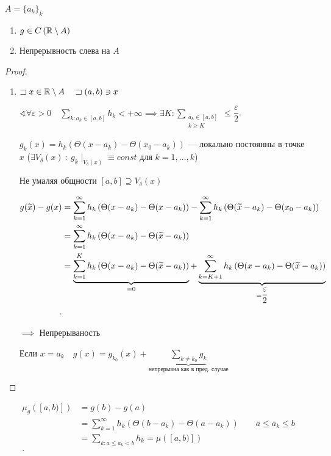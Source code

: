 \begin{statement}
    $A = \{a_k\}_k$
    \begin{enumerate}
        \item $g \in C\left( \mathbb{R} \setminus A \right) $
        \item Непрерывность слева на $A$
    \end{enumerate}
\end{statement}
\begin{proof}
\begin{enumerate}
    \item $\sqsupset x\in \mathbb{R} \setminus A\quad \sqsupset (a,b)\ni x$

    $\sphericalangle \forall \varepsilon >0 \quad \sum_{k: a_k\in [a,b] } h_k < +\infty  \implies \exists K: \sum _{\substack{a_k\in [a, b]\\ k \geqslant K }} \leqslant \dfrac{\varepsilon}{2}$.
    
    $g_k (x) = h_k \left(  \Theta (x- a_k) - \Theta(x_0 - a_k)\right)$ --- локально постоянны в точке $x$ ($\exists V_{\delta}(x)~:~ g_k\mid_{V_{\delta}(x)}\equiv const$ для $k = 1, \ldots, k$)

    Не умаляя общности $[a,b] \supseteq V_{\delta}(x) $

    \begin{align*}
    g(\tl x) - g(x) &= \sum_{k=1}^{\infty } h_k\left( \Theta(x - a_k) - \Theta(x - a_k) \right) - \sum_{k=1}^{\infty }h_k \left( \Theta(\tl x - a_k) - \Theta(x_0 - a_k) \right)\\ 
    &= \sum_{k=1}^{\infty } h_k \left( \Theta(x - a_k) - \Theta(\tl x - a_k) \right)  \\
    &= \underbrace{\sum_{k=1}^{K} h_k \left( \Theta(x - a_k) - \Theta(\tl x - a_k) \right)}_{ = 0} + \underbrace{\sum_{k=K+1}^{\infty } h_k \left( \Theta(x - a_k) - \Theta(\tl x - a_k) \right)}_{ = \dfrac{\varepsilon}{2}}  \\
    .\end{align*}

    $\implies $ Непрерываность

    Если $x = a_k\quad g(x) = g_{k_0}(x) + \underbrace{\sum _{k \neq k_0}g_k}_{\text{непрерывна как в пред. случае}}$
\end{enumerate}
\end{proof}

\begin{align*}
    \mu_g\left([a,b)]  \right) &= g(b) - g(a)\\ 
    &= \sum_{k=1}^{\infty} h_k\left( \Theta(b - a_k) - \Theta(a - a_k) \right)\qquad a \leqslant  a_k \leqslant b\\
    &= \sum_{k: a\leqslant a_k < b} h_k = \mu([a,b)])\\
.\end{align*}

